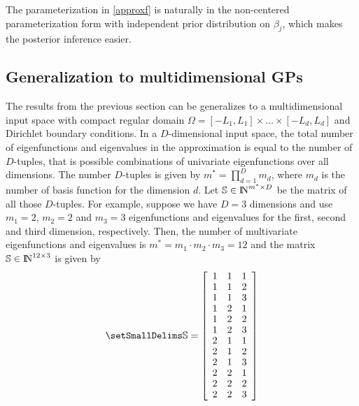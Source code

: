 \documentclass[]{interact}
\theoremstyle{plain}%
\theoremstyle{definition}
\theoremstyle{remark}
\begin{document}
The parameterization in \ref{approxf} is naturally in the non-centered
parameterization form with independent prior distribution on
$\beta_j$, which makes the posterior inference easier.

\subsection{Generalization to multidimensional GPs}

The results from the previous section can be generalizes to a multidimensional input space with compact regular domain $\Omega=[-L_1,L_1] \times \dots \times [-L_d,L_d]$ and Dirichlet boundary conditions. 
In a $D$-dimensional input space, the total number of eigenfunctions and eigenvalues in the approximation is equal to the number of $D$-tuples, that is possible combinations of univariate eigenfunctions over all dimensions. The number $D$-tuples is given by $m^{\ast} = \prod_{d=1}^{D} m_d$, where $m_d$ is the number of basis function for the dimension $d$. Let $\mathbb{S}\in {\rm I\!N}^{m^{\ast} \times D}$ be the matrix of all those $D$-tuples. For example, suppose we have $D=3$ dimensions and use $m_{1}=2$, $m_{2}=2$ and $m_{3}=3$ eigenfunctions and eigenvalues for the first, second and third dimension, respectively. Then, the number of multivariate eigenfunctions and eigenvalues is $m^{\ast} = m_{1} \cdot m_{2} \cdot m_{3} = 12$ and the matrix $\mathbb{S}\in {\rm I\!N}^{12 \times 3}$ is given by
\begin{align}\small
\mathbb{S}=
\left[ {\begin{array}{ccc}
1 & 1 & 1 \nonumber \\
1 & 1 & 2 \\
1 & 1 & 3 \\
1 & 2 & 1 \\
1 & 2 & 2 \\
1 & 2 & 3 \\
2 & 1 & 1 \\
2 & 1 & 2 \\
2 & 1 & 3 \\
2 & 2 & 1 \\
2 & 2 & 2 \\
2 & 2 & 3 
\end{array} } \right]
\end{align} 
\end{document}
